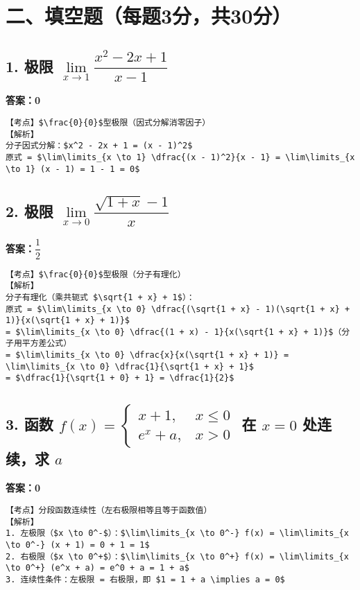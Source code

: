 \documentclass{exam-zh}
\begin{document}
\section*{二、填空题（每题3分，共30分）}

\subsection*{1. 极限 $\lim\limits_{x \to 1} \dfrac{x^2 - 2x + 1}{x - 1}$}
\noindent \textbf{答案：0}
\begin{verbatim}
【考点】$\frac{0}{0}$型极限（因式分解消零因子）
【解析】
分子因式分解：$x^2 - 2x + 1 = (x - 1)^2$
原式 = $\lim\limits_{x \to 1} \dfrac{(x - 1)^2}{x - 1} = \lim\limits_{x \to 1} (x - 1) = 1 - 1 = 0$
\end{verbatim}

\subsection*{2. 极限 $\lim\limits_{x \to 0} \dfrac{\sqrt{1 + x} - 1}{x}$}
\noindent \textbf{答案：$\dfrac{1}{2}$}
\begin{verbatim}
【考点】$\frac{0}{0}$型极限（分子有理化）
【解析】
分子有理化（乘共轭式 $\sqrt{1 + x} + 1$）：
原式 = $\lim\limits_{x \to 0} \dfrac{(\sqrt{1 + x} - 1)(\sqrt{1 + x} + 1)}{x(\sqrt{1 + x} + 1)}$
= $\lim\limits_{x \to 0} \dfrac{(1 + x) - 1}{x(\sqrt{1 + x} + 1)}$（分子用平方差公式）
= $\lim\limits_{x \to 0} \dfrac{x}{x(\sqrt{1 + x} + 1)} = \lim\limits_{x \to 0} \dfrac{1}{\sqrt{1 + x} + 1}$
= $\dfrac{1}{\sqrt{1 + 0} + 1} = \dfrac{1}{2}$
\end{verbatim}

\subsection*{3. 函数 $f(x) = \begin{cases} x + 1, & x \leq 0 \\ e^x + a, & x > 0 \end{cases}$ 在 $x = 0$ 处连续，求 $a$}
\noindent \textbf{答案：0}
\begin{verbatim}
【考点】分段函数连续性（左右极限相等且等于函数值）
【解析】
1. 左极限（$x \to 0^-$）：$\lim\limits_{x \to 0^-} f(x) = \lim\limits_{x \to 0^-} (x + 1) = 0 + 1 = 1$
2. 右极限（$x \to 0^+$）：$\lim\limits_{x \to 0^+} f(x) = \lim\limits_{x \to 0^+} (e^x + a) = e^0 + a = 1 + a$
3. 连续性条件：左极限 = 右极限，即 $1 = 1 + a \implies a = 0$
\end{verbatim}
\end{document}
